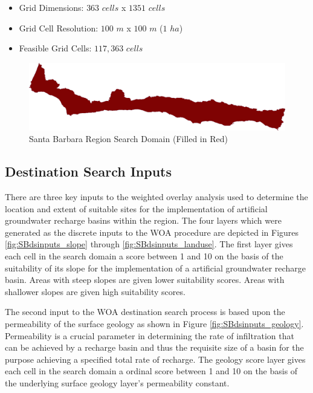     \begin{itemize}
      \setlength{\itemsep}{0cm}
      \setlength{\parskip}{0cm}
        \item Grid Dimensions: $363$ $cells$ x $1351$ $cells$
        \item Grid Cell Resolution: $100$ $m$ x $100$ $m$ ($1$ $ha$)
        \item Feasible Grid Cells: $117,363$ $cells$
    \end{itemize}
    
        \begin{figure}[!h]
            \begin{center}
            \includegraphics[width=5.5in]{figures/SantaBarbara_SearchDomain.png}   
            \caption{Santa Barbara Region Search Domain (Filled in Red)}
            \label{fig:SBdomain}
            \end{center}
        \end{figure}
        
    \subsection{Destination Search Inputs}

There are three key inputs to the weighted overlay analysis used to determine the location and extent of suitable sites for the implementation of artificial groundwater recharge basins within the region. The four layers which were generated as the discrete inputs to the WOA procedure are depicted in Figures \ref{fig:SBdsinputs_slope} through \ref{fig:SBdsinputs_landuse}. The first layer gives each cell in the search domain a score between 1 and 10 on the basis of the suitability of its slope for the implementation of a artificial groundwater recharge basin. Areas with steep slopes are given lower suitability scores. Areas with shallower slopes are given high suitability scores. 

The second input to the WOA destination search process is based upon the permeability of the surface geology as shown in Figure \ref{fig:SBdsinputs_geology}. Permeability is a crucial parameter in determining the rate of infiltration that can be achieved by a recharge basin and thus the requisite size of a basin for the purpose achieving a specified total rate of recharge. The geology score layer gives each cell in the search domain a ordinal score between 1 and 10 on the basis of the underlying surface geology layer's permeability constant.

